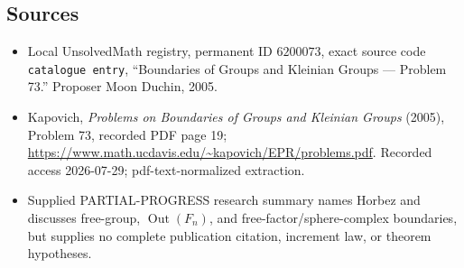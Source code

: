 \documentclass[11pt]{article}
\begin{document}
\subsection{Sources}
\begin{itemize}
\item Local UnsolvedMath registry, permanent ID \(6200073\), exact source code \texttt{catalogue entry}, ``Boundaries of Groups and Kleinian Groups --- Problem 73.'' Proposer Moon Duchin, 2005.
\item Kapovich, \emph{Problems on Boundaries of Groups and Kleinian Groups} (2005), Problem 73, recorded PDF page 19; \url{https://www.math.ucdavis.edu/~kapovich/EPR/problems.pdf}. Recorded access 2026-07-29; pdf-text-normalized extraction.
\item Supplied PARTIAL-PROGRESS research summary names Horbez and discusses free-group, \(\operatorname{Out}(F_n)\), and free-factor/sphere-complex boundaries, but supplies no complete publication citation, increment law, or theorem hypotheses.
\end{itemize}
\end{document}
